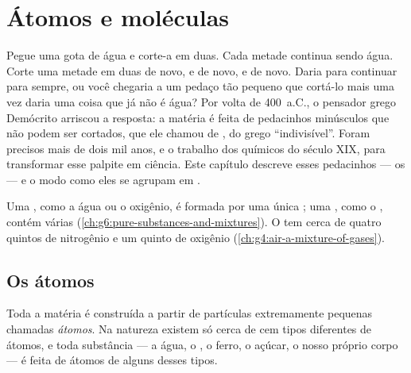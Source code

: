 \chapter{Átomos e moléculas}\label{ch:g7:atoms-and-molecules}

Pegue uma gota de água e corte-a em duas. Cada metade continua sendo
água. Corte uma metade em duas de novo, e de novo, e de novo. Daria para
continuar para sempre, ou você chegaria a um pedaço tão pequeno que
cortá-lo mais uma vez daria uma coisa que já não é água? Por volta de
400~a.C., o pensador grego Demócrito arriscou a resposta: a matéria é
feita de pedacinhos minúsculos que não podem ser cortados, que ele
chamou de \emph{}, do grego ``indivisível''. Foram precisos mais de
dois mil anos, e o trabalho dos químicos do século XIX, para transformar
esse palpite em ciência. Este capítulo descreve esses pedacinhos --- os
 --- e o modo como eles se agrupam em .

\begin{recall}
Uma , como a água ou o oxigênio, é formada por uma única
; uma , como o , contém várias
(\cref{ch:g6:pure-substances-and-mixtures}). O  tem cerca de quatro
quintos de nitrogênio e um quinto de oxigênio
(\cref{ch:g4:air-a-mixture-of-gases}).
\end{recall}

\section{Os átomos}

\begin{definition}[Átomo]\label{def:g7:atoms-and-molecules:atom}
Toda a matéria é construída a partir de partículas extremamente
pequenas chamadas \emph{átomos}. Na natureza existem só
cerca de cem tipos diferentes de átomos, e toda substância --- a água, o
, o ferro, o açúcar, o nosso próprio corpo --- é feita de átomos de
alguns desses tipos.
\end{definition}

